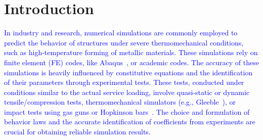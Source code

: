 \documentclass[algorithms,article,submit,pdftex,oneauthors]{Definitions/mdpi}
\begin{document}
\section{Introduction}\label{sec:Introduction}

\textcolor{blue}{In industry and research, numerical simulations are commonly employed to predict the behavior of structures under severe thermomechanical conditions, such as high-temperature forming of metallic materials.
These simulations rely on finite element (FE) codes, like Abaqus~\cite{Abaqus}, or academic codes.
The accuracy of these simulations is heavily influenced by constitutive equations and the identification of their parameters through experimental tests.
These tests, conducted under conditions similar to the actual service loading, involve quasi-static or dynamic tensile/compression tests, thermomechanical simulators (e.g., Gleeble~\cite{Lin-2009-MFS, Bennett-2010-C, Kumar-2016-TMS, Yu-2019-RCR}), or impact tests using gas guns or Hopkinson bars~\cite{Kolsky-1949-IMP}.
The choice and formulation of behavior laws and the accurate identification of coefficients from experiments are crucial for obtaining reliable simulation results.}
\end{document}
